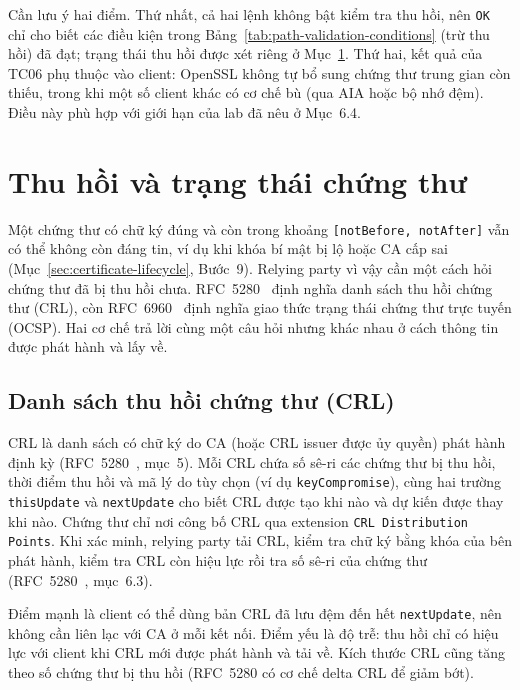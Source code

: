 Cần lưu ý hai điểm. Thứ nhất, cả hai lệnh không bật kiểm tra thu hồi, nên \texttt{OK} chỉ cho biết các điều kiện trong Bảng~\ref{tab:path-validation-conditions} (trừ thu hồi) đã đạt; trạng thái thu hồi được xét riêng ở Mục~\ref{sec:revocation-mechanisms}. Thứ hai, kết quả của TC06 phụ thuộc vào client: OpenSSL không tự bổ sung chứng thư trung gian còn thiếu, trong khi một số client khác có cơ chế bù (qua AIA hoặc bộ nhớ đệm). Điều này phù hợp với giới hạn của lab đã nêu ở Mục~6.4.

\section{Thu hồi và trạng thái chứng thư}
\label{sec:revocation-mechanisms}

Một chứng thư có chữ ký đúng và còn trong khoảng \texttt{[notBefore, notAfter]} vẫn có thể không còn đáng tin, ví dụ khi khóa bí mật bị lộ hoặc CA cấp sai (Mục~\ref{sec:certificate-lifecycle}, Bước~9). Relying party vì vậy cần một cách hỏi chứng thư đã bị thu hồi chưa. RFC~5280~\cite{rfc5280} định nghĩa danh sách thu hồi chứng thư (CRL), còn RFC~6960~\cite{rfc6960} định nghĩa giao thức trạng thái chứng thư trực tuyến (OCSP). Hai cơ chế trả lời cùng một câu hỏi nhưng khác nhau ở cách thông tin được phát hành và lấy về.

\subsection{Danh sách thu hồi chứng thư (CRL)}
\label{subsec:crl}

CRL là danh sách có chữ ký do CA (hoặc CRL issuer được ủy quyền) phát hành định kỳ (RFC~5280~\cite{rfc5280}, mục~5). Mỗi CRL chứa số sê-ri các chứng thư bị thu hồi, thời điểm thu hồi và mã lý do tùy chọn (ví dụ \texttt{keyCompromise}), cùng hai trường \texttt{thisUpdate} và \texttt{nextUpdate} cho biết CRL được tạo khi nào và dự kiến được thay khi nào. Chứng thư chỉ nơi công bố CRL qua extension \texttt{CRL Distribution Points}. Khi xác minh, relying party tải CRL, kiểm tra chữ ký bằng khóa của bên phát hành, kiểm tra CRL còn hiệu lực rồi tra số sê-ri của chứng thư (RFC~5280~\cite{rfc5280}, mục~6.3).

Điểm mạnh là client có thể dùng bản CRL đã lưu đệm đến hết \texttt{nextUpdate}, nên không cần liên lạc với CA ở mỗi kết nối. Điểm yếu là độ trễ: thu hồi chỉ có hiệu lực với client khi CRL mới được phát hành và tải về. Kích thước CRL cũng tăng theo số chứng thư bị thu hồi (RFC~5280 có cơ chế delta CRL để giảm bớt).

